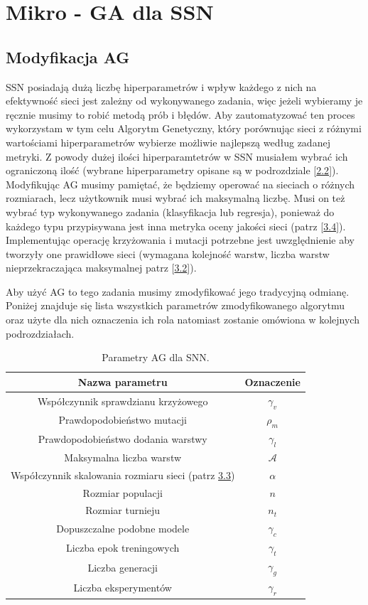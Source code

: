 \documentclass{article}
\begin{document}
\section{Mikro - GA dla SSN}
\subsection{Modyfikacja AG}
SSN posiadają dużą liczbę hiperparametrów i wpływ każdego z nich na efektywność sieci jest
zależny od wykonywanego zadania, więc jeżeli wybieramy je ręcznie musimy to robić
metodą prób i błędów.
Aby zautomatyzować ten proces wykorzystam w tym celu Algorytm Genetyczny, który porównując
sieci z różnymi wartościami hiperparametrów wybierze możliwie najlepszą według zadanej 
metryki. Z powody dużej ilości hiperparamtetrów w SSN musiałem wybrać ich ograniczoną ilość
(wybrane hiperparametry opisane są w podrozdziale [\hyperref[sec:ssn]{2.2}]).
Modyfikując AG musimy pamiętać, że będziemy operować na sieciach o różnych rozmiarach, lecz
użytkownik musi wybrać ich maksymalną liczbę. Musi on też wybrać typ wykonywanego zadania 
(klasyfikacja lub regresja), ponieważ do każdego typu przypisywana jest inna metryka
oceny jakości sieci (patrz [\hyperref[sec:ocena]{3.4}]).
Implementując operację krzyżowania i mutacji potrzebne jest uwzględnienie aby tworzyły one
prawidłowe sieci (wymagana kolejność warstw, liczba warstw nieprzekraczająca maksymalnej
 patrz [\hyperref[sec:ossn]{3.2}]).


Aby użyć AG to tego zadania musimy zmodyfikować jego tradycyjną odmianę.
Poniżej znajduje się lista wszystkich 
parametrów zmodyfikowanego algorytmu oraz użyte dla nich oznaczenia
ich rola natomiast zostanie omówiona w kolejnych podrozdziałach.
\begin{table}[H]
\centering
\begin{tabular}{|c|c|}
	\hline
	Nazwa parametru & Oznaczenie \\
	\hline
	Współczynnik sprawdzianu krzyżowego & $\gamma_v$ \\
	Prawdopodobieństwo mutacji & $\rho_m$ \\
	Prawdopodobieństwo dodania warstwy & $\gamma_l$ \\
	Maksymalna liczba warstw & $\mathcal{A}$ \\
	Współczynnik skalowania rozmiaru sieci (patrz \hyperref[sec:ocena]{3.3}) & $\alpha$ \\
	Rozmiar populacji & $n$ \\
	Rozmiar turnieju & $n_t$ \\
	Dopuszczalne podobne modele & $\gamma_c$\\
	Liczba epok treningowych & $\gamma_t$\\
	Liczba generacji & $\gamma_g$\\
	Liczba eksperymentów & $\gamma_r$\\
	\hline
\end{tabular}
\caption{\label{tab:params}Parametry AG dla SNN.}
\end{table}
\end{document}
